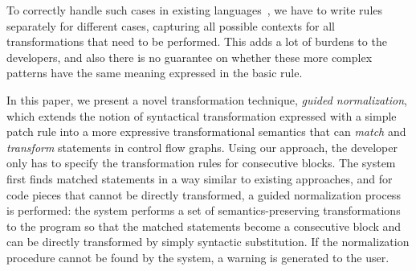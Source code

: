 \documentclass[a4paper, USenglish]{lipics-v2016}
\theoremstyle{plain}
\begin{document}
To correctly handle such cases in existing
languages~\cite{DBLP:conf/eurosys/PadioleauLHM08,Bravenboer:2008:SLT:1385689.1385715,Cordy:2006:TST:1149670.1149672}, we have to write rules separately for different cases, capturing all possible
contexts for all transformations that need to
be performed. This adds a lot of burdens to the developers, and also
there is no guarantee on whether these more complex patterns have the same meaning expressed in the basic rule. 

In this paper, we present a novel transformation technique,
\emph{guided normalization}, which extends the notion of syntactical
transformation expressed with a simple patch rule into a more
expressive transformational semantics that can \emph{match} and
\emph{transform} statements in control flow graphs. Using our
approach, the developer only has to specify the transformation rules
for consecutive blocks. The system first finds matched statements in a
way similar to existing approaches, and for code pieces that cannot be
directly transformed, a guided normalization process is performed: the
system performs a set of semantics-preserving transformations to the
program so that the matched statements become a consecutive block and
can be directly transformed by simply syntactic substitution. If the normalization procedure cannot be found by the system, a warning is generated to the user.
\end{document}
